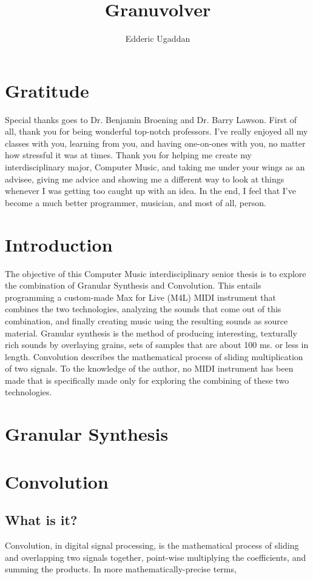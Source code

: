 \documentclass{article}
\author{Edderic Ugaddan}
\title{Granuvolver}
\begin{document}
	\maketitle
	\tableofcontents
	\section{Gratitude}

	Special thanks goes to Dr. Benjamin Broening and Dr. Barry Lawson. First of all, thank you for being wonderful top-notch professors. I've really enjoyed all my classes with you, learning from you, and having one-on-ones with you, no matter how stressful it was at times. Thank you for helping me create my interdisciplinary major, Computer Music, and taking me under your wings as an advisee, giving me advice and showing me a different way to look at things whenever I was getting too caught up with an idea.  In the end, I feel that I've become a much better programmer, musician, and most of all, person.

	\section{Introduction}

	The objective of this Computer Music interdisciplinary senior thesis is to explore the combination of Granular Synthesis and Convolution. This entails programming a custom-made Max for Live (M4L) MIDI instrument that combines the two technologies, analyzing the sounds that come out of this combination, and finally creating music using the resulting sounds as source material. Granular synthesis is the method of producing interesting, texturally rich sounds by overlaying grains, sets of samples that are about 100 ms. or less in length. Convolution describes the mathematical process of sliding multiplication of two signals.   To the knowledge of the author, no MIDI instrument has been made that is specifically made only for exploring the combining of these two technologies.


	\section{Granular Synthesis}
	\section{Convolution}
		\subsection{What is it?}
			Convolution, in digital signal processing, is the mathematical process of sliding and overlapping two signals together, point-wise multiplying the coefficients, and summing the products. In more mathematically-precise terms, 
\end{document}
